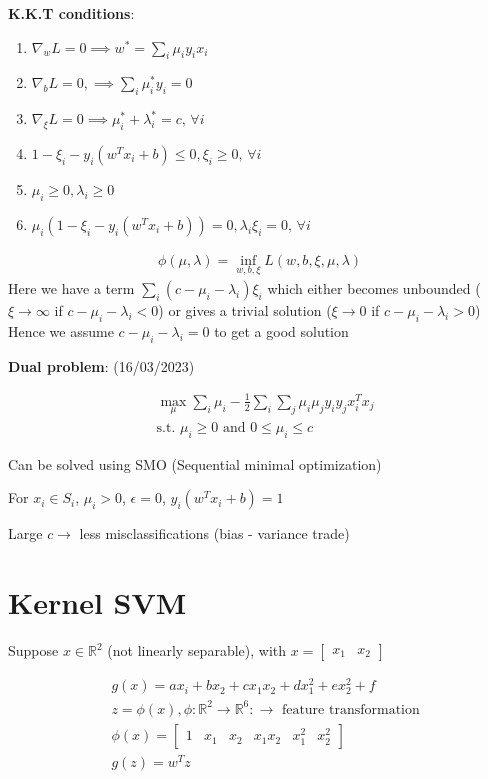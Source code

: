 \documentclass[11pt]{article}
\begin{document}
\textbf{K.K.T conditions}:
\begin{enumerate}
\item \(\nabla_w L = 0 \implies w^{*} = \sum_i \mu_i y_i x_i\)
\item \(\nabla_bL = 0, \implies \sum_i \mu_i^{*}y_i = 0\)
\item \(\nabla_{\xi}L = 0 \implies \mu_i^{*} + \lambda_i^{*} = c, \,\forall i\)
\item \(1 - \xi_i - y_i(w^Tx_i + b) \leq 0, \xi_i \geq 0, \,\forall i\)
\item \(\mu_i \geq 0, \lambda_i \geq 0\)
\item \(\mu_i (1 - \xi_i - y_i(w^Tx_i + b)) = 0, \lambda_i\xi_i = 0, \,\forall i\)
\end{enumerate}

\begin{align*}
\phi(\mu, \lambda) = \inf_{w, b, \xi} L(w, b, \xi, \mu, \lambda)
\end{align*}
Here we have a term \(\sum_i (c - \mu_i - \lambda_i)\xi_i\) which either becomes unbounded (\(\xi \rightarrow \infty\) if \(c - \mu_i - \lambda_i < 0\))
or gives a trivial solution (\(\xi \rightarrow 0\) if \(c - \mu_i - \lambda_i > 0\))
Hence we assume \(c - \mu_i - \lambda_i = 0\) to get a good solution

\textbf{Dual problem}: (16/03/2023)

\begin{align*}
&\max_{\mu} \sum_i \mu_i - \frac{1}{2} \sum_i\sum_j \mu_i\mu_j y_iy_j x_i^Tx_j \\
&\text{s.t. }\mu_i \geq 0\text{ and } 0 \leq \mu_i \leq c
\end{align*}

Can be solved using SMO (Sequential minimal optimization)

For \(x_i \in S_i\), \(\mu_i > 0\), \(\epsilon = 0\), \(y_i(w^Tx_i + b) = 1\)

Large \(c \rightarrow\) less misclassifications (bias - variance trade)

\section{Kernel SVM}
\label{sec:org957a92d}
Suppose \(x \in \mathbb{R}^2\) (not linearly separable), with \(x = \begin{bmatrix} x_1 & x_2 \end{bmatrix}\)

\begin{align*}
&g(x) = ax_i + bx_2 + cx_1x_2 + dx_1^2 + ex_2^2 + f \\
&z = \phi(x), \phi: \mathbb{R}^2 \rightarrow \mathbb{R}^6 :\rightarrow \text{ feature transformation} \\
&\phi(x) = \begin{bmatrix} 1 & x_1 & x_2 & x_1x_2 & x_1^2 & x_2^2\end{bmatrix} \\
&g(z) = w^Tz
\end{align*}
\end{document}
